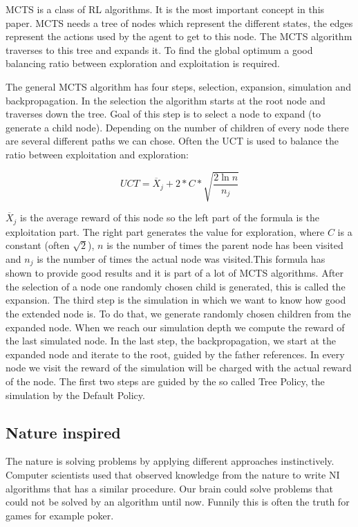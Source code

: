\ac{MCTS} is a class of \ac{RL} algorithms. It is the most important concept in this paper. \ac{MCTS} needs a tree of nodes which represent the different states, the edges represent the actions used by the agent to get to this node. The \ac{MCTS} algorithm traverses to this tree and expands it. To find the global optimum a good balancing ratio between exploration and exploitation is required. 

The general \ac{MCTS} algorithm has four steps, selection, expansion, simulation and backpropagation.
In the selection the algorithm starts at the root node and traverses down the tree. Goal of this step is to select a node to expand (to generate a child node). Depending on the number of children of every node there are several different paths we can chose. Often the \ac{UCT} is used to balance the ratio between exploitation and exploration:

\begin{equation}
	UCT = \overline{X}_j + 2 * C * \sqrt{\frac{2 \ln n}{n_j}}
\end{equation}

$\overline{X}_j$ is the average reward of this node so the left part of the formula is the exploitation part. The right part generates the value for exploration, where $C$ is a constant (often $\sqrt{2}$), $n$ is the number of times the parent node has been visited and $n_j$ is the number of times the actual node was visited.This formula has shown to provide good results and it is part of a lot of \ac{MCTS} algorithms.
After the selection of a node one randomly chosen child is generated, this is called the expansion.
The third step is the simulation in which we want to know how good the extended node is. To do that, we generate randomly chosen children from the expanded node. When we reach our simulation depth we compute the reward of the last simulated node.
In the last step, the backpropagation, we start at the expanded node and iterate to the root, guided by the father references. In every node we visit the reward of the simulation will be charged with the actual reward of the node.
The first two steps are guided by the so called Tree Policy, the simulation by the Default Policy.


\subsection{Nature inspired} 
The nature is solving problems by applying different approaches instinctively. Computer scientists used that observed knowledge from the
nature to write \ac{NI} algorithms that has a similar procedure. Our brain could solve problems that could not be solved by an algorithm until now. Funnily this is often the truth for games for example poker.

